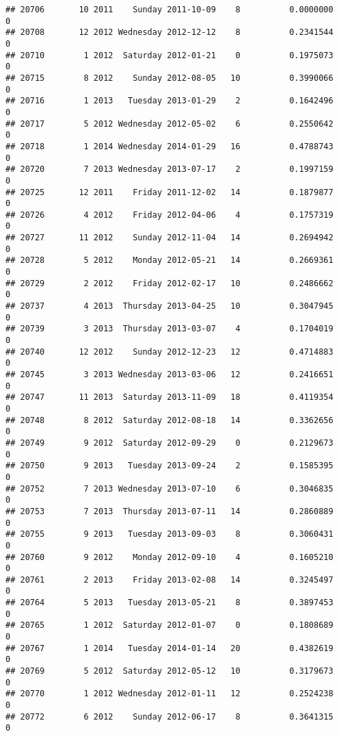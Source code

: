 \documentclass[
]{article}
\begin{document}
\begin{verbatim}
## 20706       10 2011    Sunday 2011-10-09    8          0.0000000             0
## 20708       12 2012 Wednesday 2012-12-12    8          0.2341544             0
## 20710        1 2012  Saturday 2012-01-21    0          0.1975073             0
## 20715        8 2012    Sunday 2012-08-05   10          0.3990066             0
## 20716        1 2013   Tuesday 2013-01-29    2          0.1642496             0
## 20717        5 2012 Wednesday 2012-05-02    6          0.2550642             0
## 20718        1 2014 Wednesday 2014-01-29   16          0.4788743             0
## 20720        7 2013 Wednesday 2013-07-17    2          0.1997159             0
## 20725       12 2011    Friday 2011-12-02   14          0.1879877             0
## 20726        4 2012    Friday 2012-04-06    4          0.1757319             0
## 20727       11 2012    Sunday 2012-11-04   14          0.2694942             0
## 20728        5 2012    Monday 2012-05-21   14          0.2669361             0
## 20729        2 2012    Friday 2012-02-17   10          0.2486662             0
## 20737        4 2013  Thursday 2013-04-25   10          0.3047945             0
## 20739        3 2013  Thursday 2013-03-07    4          0.1704019             0
## 20740       12 2012    Sunday 2012-12-23   12          0.4714883             0
## 20745        3 2013 Wednesday 2013-03-06   12          0.2416651             0
## 20747       11 2013  Saturday 2013-11-09   18          0.4119354             0
## 20748        8 2012  Saturday 2012-08-18   14          0.3362656             0
## 20749        9 2012  Saturday 2012-09-29    0          0.2129673             0
## 20750        9 2013   Tuesday 2013-09-24    2          0.1585395             0
## 20752        7 2013 Wednesday 2013-07-10    6          0.3046835             0
## 20753        7 2013  Thursday 2013-07-11   14          0.2860889             0
## 20755        9 2013   Tuesday 2013-09-03    8          0.3060431             0
## 20760        9 2012    Monday 2012-09-10    4          0.1605210             0
## 20761        2 2013    Friday 2013-02-08   14          0.3245497             0
## 20764        5 2013   Tuesday 2013-05-21    8          0.3897453             0
## 20765        1 2012  Saturday 2012-01-07    0          0.1808689             0
## 20767        1 2014   Tuesday 2014-01-14   20          0.4382619             0
## 20769        5 2012  Saturday 2012-05-12   10          0.3179673             0
## 20770        1 2012 Wednesday 2012-01-11   12          0.2524238             0
## 20772        6 2012    Sunday 2012-06-17    8          0.3641315             0

\end{verbatim}
\end{document}
